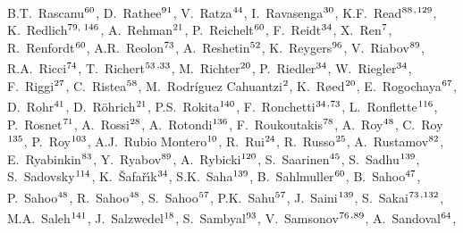 \begin{flushleft}
B.T.~Rascanu$^\textrm{\scriptsize 60}$,
D.~Rathee$^\textrm{\scriptsize 91}$,
V.~Ratza$^\textrm{\scriptsize 44}$,
I.~Ravasenga$^\textrm{\scriptsize 30}$,
K.F.~Read$^\textrm{\scriptsize 88}$\textsuperscript{,}$^\textrm{\scriptsize 129}$,
K.~Redlich$^\textrm{\scriptsize 79, 146}$,
A.~Rehman$^\textrm{\scriptsize 21}$,
P.~Reichelt$^\textrm{\scriptsize 60}$,
F.~Reidt$^\textrm{\scriptsize 34}$,
X.~Ren$^\textrm{\scriptsize 7}$,
R.~Renfordt$^\textrm{\scriptsize 60}$,
A.R.~Reolon$^\textrm{\scriptsize 73}$,
A.~Reshetin$^\textrm{\scriptsize 52}$,
K.~Reygers$^\textrm{\scriptsize 96}$,
V.~Riabov$^\textrm{\scriptsize 89}$,
R.A.~Ricci$^\textrm{\scriptsize 74}$,
T.~Richert$^\textrm{\scriptsize 53}$\textsuperscript{,}$^\textrm{\scriptsize 33}$,
M.~Richter$^\textrm{\scriptsize 20}$,
P.~Riedler$^\textrm{\scriptsize 34}$,
W.~Riegler$^\textrm{\scriptsize 34}$,
F.~Riggi$^\textrm{\scriptsize 27}$,
C.~Ristea$^\textrm{\scriptsize 58}$,
M.~Rodr\'{i}guez Cahuantzi$^\textrm{\scriptsize 2}$,
K.~R{\o}ed$^\textrm{\scriptsize 20}$,
E.~Rogochaya$^\textrm{\scriptsize 67}$,
D.~Rohr$^\textrm{\scriptsize 41}$,
D.~R\"ohrich$^\textrm{\scriptsize 21}$,
P.S.~Rokita$^\textrm{\scriptsize 140}$,
F.~Ronchetti$^\textrm{\scriptsize 34}$\textsuperscript{,}$^\textrm{\scriptsize 73}$,
L.~Ronflette$^\textrm{\scriptsize 116}$,
P.~Rosnet$^\textrm{\scriptsize 71}$,
A.~Rossi$^\textrm{\scriptsize 28}$,
A.~Rotondi$^\textrm{\scriptsize 136}$,
F.~Roukoutakis$^\textrm{\scriptsize 78}$,
A.~Roy$^\textrm{\scriptsize 48}$,
C.~Roy$^\textrm{\scriptsize 135}$,
P.~Roy$^\textrm{\scriptsize 103}$,
A.J.~Rubio Montero$^\textrm{\scriptsize 10}$,
R.~Rui$^\textrm{\scriptsize 24}$,
R.~Russo$^\textrm{\scriptsize 25}$,
A.~Rustamov$^\textrm{\scriptsize 82}$,
E.~Ryabinkin$^\textrm{\scriptsize 83}$,
Y.~Ryabov$^\textrm{\scriptsize 89}$,
A.~Rybicki$^\textrm{\scriptsize 120}$,
S.~Saarinen$^\textrm{\scriptsize 45}$,
S.~Sadhu$^\textrm{\scriptsize 139}$,
S.~Sadovsky$^\textrm{\scriptsize 114}$,
K.~\v{S}afa\v{r}\'{\i}k$^\textrm{\scriptsize 34}$,
S.K.~Saha$^\textrm{\scriptsize 139}$,
B.~Sahlmuller$^\textrm{\scriptsize 60}$,
B.~Sahoo$^\textrm{\scriptsize 47}$,
P.~Sahoo$^\textrm{\scriptsize 48}$,
R.~Sahoo$^\textrm{\scriptsize 48}$,
S.~Sahoo$^\textrm{\scriptsize 57}$,
P.K.~Sahu$^\textrm{\scriptsize 57}$,
J.~Saini$^\textrm{\scriptsize 139}$,
S.~Sakai$^\textrm{\scriptsize 73}$\textsuperscript{,}$^\textrm{\scriptsize 132}$,
M.A.~Saleh$^\textrm{\scriptsize 141}$,
J.~Salzwedel$^\textrm{\scriptsize 18}$,
S.~Sambyal$^\textrm{\scriptsize 93}$,
V.~Samsonov$^\textrm{\scriptsize 76}$\textsuperscript{,}$^\textrm{\scriptsize 89}$,
A.~Sandoval$^\textrm{\scriptsize 64}$,

\end{flushleft}
